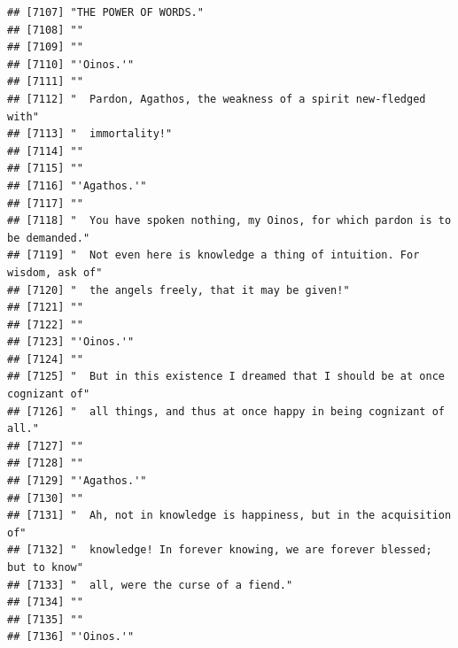 \documentclass{article}\usepackage[]{graphicx}\usepackage[]{color}
\makeatletter
\newenvironment{kframe}{%
 \def\at@end@of@kframe{}%
 \ifinner\ifhmode%
  \def\at@end@of@kframe{\end{minipage}}%
  \begin{minipage}{\columnwidth}%
 \fi\fi%
 \def\FrameCommand##1{\hskip\@totalleftmargin \hskip-\fboxsep
 \colorbox{shadecolor}{##1}\hskip-\fboxsep
     \hskip-\linewidth \hskip-\@totalleftmargin \hskip\columnwidth}%
 \MakeFramed {\advance\hsize-\width
   \@totalleftmargin\z@ \linewidth\hsize
   \@setminipage}}%
 {\par\unskip\endMakeFramed%
 \at@end@of@kframe}
\newenvironment{knitrout}{}{} %
\makeatother
\begin{document}
\begin{knitrout}
\begin{kframe}
\begin{verbatim}
## [7107] "THE POWER OF WORDS."                                                         
## [7108] ""                                                                            
## [7109] ""                                                                            
## [7110] "'Oinos.'"                                                                    
## [7111] ""                                                                            
## [7112] "  Pardon, Agathos, the weakness of a spirit new-fledged with"                
## [7113] "  immortality!"                                                              
## [7114] ""                                                                            
## [7115] ""                                                                            
## [7116] "'Agathos.'"                                                                  
## [7117] ""                                                                            
## [7118] "  You have spoken nothing, my Oinos, for which pardon is to be demanded."    
## [7119] "  Not even here is knowledge a thing of intuition. For wisdom, ask of"       
## [7120] "  the angels freely, that it may be given!"                                  
## [7121] ""                                                                            
## [7122] ""                                                                            
## [7123] "'Oinos.'"                                                                    
## [7124] ""                                                                            
## [7125] "  But in this existence I dreamed that I should be at once cognizant of"     
## [7126] "  all things, and thus at once happy in being cognizant of all."             
## [7127] ""                                                                            
## [7128] ""                                                                            
## [7129] "'Agathos.'"                                                                  
## [7130] ""                                                                            
## [7131] "  Ah, not in knowledge is happiness, but in the acquisition of"              
## [7132] "  knowledge! In forever knowing, we are forever blessed; but to know"        
## [7133] "  all, were the curse of a fiend."                                           
## [7134] ""                                                                            
## [7135] ""                                                                            
## [7136] "'Oinos.'"                                                                    

\end{verbatim}
\end{kframe}
\end{knitrout}
\end{document}
